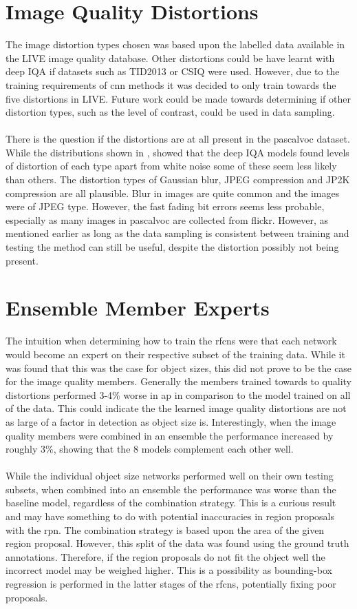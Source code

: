 \section{Image Quality Distortions}
The image distortion types chosen was based upon the labelled data available in the LIVE image quality database. Other distortions could be have learnt with deep IQA if datasets such as TID2013 \cite{tid2013} or CSIQ \cite{csiq} were used. However, due to the training requirements of \gls{cnn} methods it was decided to only train towards the five distortions in LIVE. Future work could be made towards determining if other distortion types, such as the level of contrast, could be used in data sampling. 
\\\\
There is the question if the distortions are at all present in the \gls{pascalvoc} dataset. While the distributions shown in , showed that the deep IQA models found levels of distortion of each type apart from white noise some of these seem less likely than others. The distortion types of Gaussian blur, JPEG compression and JP2K compression are all plausible. Blur in images are quite common and the images were of JPEG type. However, the fast fading bit errors seems less probable, especially as many images in \gls{pascalvoc} are collected from flickr. However, as mentioned earlier as long as the data sampling is consistent between training and testing the method can still be useful, despite the distortion possibly not being present.

\section{Ensemble Member Experts}
The intuition when determining how to train the \glspl{rfcn} were that each network would become an expert on their respective subset of the training data. While it was found that this was the case for object sizes, this did not prove to be the case for the image quality members. Generally the members trained towards to quality distortions performed 3-4\% worse in \gls{ap} in comparison to the model trained on all of the data. This could indicate the the learned image quality distortions are not as large of a factor in detection as object size is. Interestingly, when the image quality members were combined in an ensemble the performance increased by roughly 3\%, showing that the 8 models complement each other well. 
\\\\
While the individual object size networks performed well on their own testing subsets, when combined into an ensemble the performance was worse than the baseline model, regardless of the combination strategy. This is a curious result and may have something to do with potential inaccuracies in region proposals with the \gls{rpn}. The combination strategy is based upon the area of the given region proposal. However, this split of the data was found using the ground truth annotations. Therefore, if the region proposals do not fit the object well the incorrect model may be weighed higher. This is a possibility as bounding-box regression is performed in the latter stages of the \glspl{rfcn}, potentially fixing poor proposals. 

